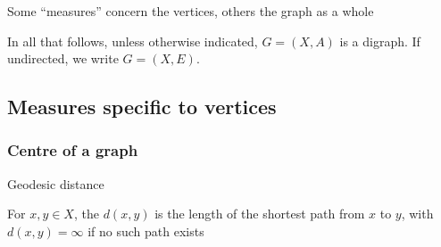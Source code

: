 \documentclass[aspectratio=43]{beamer}
\begin{document}
\begin{frame}
	Some ``measures'' concern the vertices, others the graph as a whole
	
	In all that follows, unless otherwise indicated, $G=(X,A)$ is a digraph. If undirected, we write $G=(X,E)$.
\end{frame}

\subsection{Measures specific to vertices}


\subsubsection{Centre of a graph}

\begin{frame}{Geodesic distance}
\begin{definition}
For $x,y\in X$, the  $d(x,y)$ is the length of the shortest path from $x$ to $y$, with $d(x,y)=\infty$ if no such path exists
\end{definition}
\end{frame}
\end{document}
